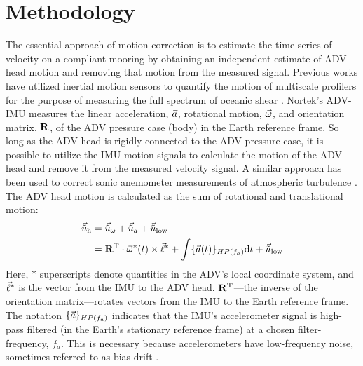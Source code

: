 
\section{Methodology}
\label{sec:methods}


\def\ue{\ensuremath{\vec{\tilde{u}}\earth}}


The essential approach of motion correction is to estimate the time series of velocity on a compliant mooring by obtaining an independent estimate of ADV head motion and removing that motion from the measured signal. Previous works have utilized inertial motion sensors to quantify the motion of multiscale profilers for the purpose of measuring the full spectrum of oceanic shear \cite[]{Winkel++1996}. Nortek's ADV-IMU measures the linear acceleration, ${\vec{a}}$, rotational motion, $\vec{\omega}$, and orientation matrix, $\mathbf{R}$, of the ADV pressure case (body) in the Earth reference frame. So long as the ADV head is rigidly connected to the ADV pressure case, it is possible to utilize the IMU motion signals to calculate the motion of the ADV head and remove it from the measured velocity signal. A similar approach has been used to correct sonic anemometer measurements of atmospheric turbulence \cite[e.g., ][]{Miller++2008}.  The ADV head motion is calculated as the sum of rotational and translational motion:
\begin{align}
  \label{eqn:uhead}
\begin{split}
  \uhead & = \urot + \uacc + \ulow \\
      & = \omatinv \cdot \AngRt^*(t)\times\l + \int \{\Accel(t)\}_{HP(f_{a})} \mathrm{d}t + \ulow
\end{split}
\end{align}
Here, $*$ superscripts denote quantities in the ADV's local coordinate system, and $\vec{\ell}^*$ is the vector from the IMU to the ADV head. $\mathbf{R}^\mathrm{T}$---the inverse of the orientation matrix---rotates vectors from the IMU to the Earth reference frame. The notation $\{{\vec{a}}\}_{HP(f_a)}$ indicates that the IMU's accelerometer signal is high-pass filtered (in the Earth's stationary reference frame) at a chosen filter-frequency, $f_a$. This is necessary because accelerometers have low-frequency noise, sometimes referred to as bias-drift \cite[]{Barshan+Whyte1995, Bevly2004, Gulmammadov2009}.

